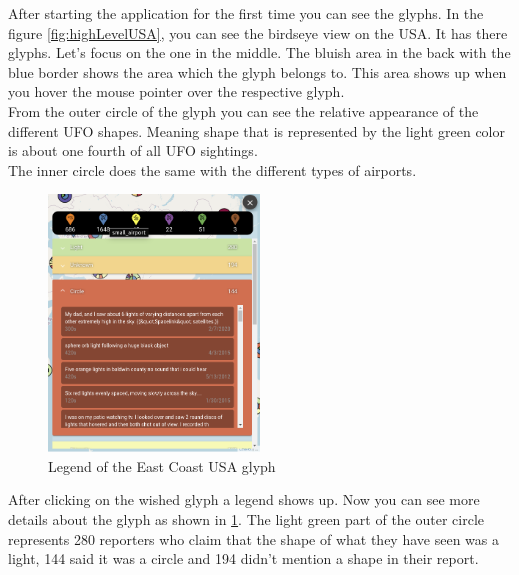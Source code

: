 \documentclass{article}
\begin{document}
After starting the application for the first time you can see the glyphs. In the figure \ref{fig:highLevelUSA}, you can see the birdseye view on the USA. It has there glyphs. Let's focus on the one in the middle. The bluish area in the back with the blue border shows the area which the glyph belongs to. This area shows up when you hover the mouse pointer over the respective glyph.
\\
From the outer circle of the glyph you can see the relative appearance of the different UFO shapes. Meaning shape that is represented by the light green color is about one fourth of all UFO sightings.
\\
The inner circle does the same with the different types of airports.
\\

\begin{figure} 
    \centering
    \includegraphics[width=0.5\textwidth]{legendEastCostUsa2}
    \caption{Legend of the East Coast USA glyph}
    \label{fig:legendEastCostUsa2}
\end{figure}

After clicking on the wished glyph a legend shows up. 
Now you can see more details about the glyph as shown in \ref{fig:legendEastCostUsa2}. 
The light green part of the outer circle represents 280 reporters who claim that the shape 
of what they have seen was a light, 144 said it was a circle and 194 
didn't mention a shape in their report. \\
\end{document}
